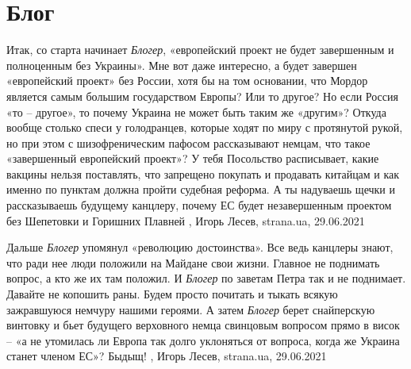  
 
 
 
 
\chapter{Блог}
\label{sec:slova.blog}

Итак, со старта начинает \emph{Блогер}, «европейский проект не будет завершенным и
полноценным без Украины». Мне вот даже интересно, а будет завершен «европейский
проект» без России, хотя бы на том основании, что Мордор является самым большим
государством Европы? Или то другое? Но если Россия «то – другое», то почему
Украина не может быть таким же «другим»? Откуда вообще столько спеси у
голодранцев, которые ходят по миру с протянутой рукой, но при этом с
шизофреническим пафосом рассказывают немцам, что такое «завершенный европейский
проект»? У тебя Посольство расписывает, какие вакцины нельзя поставлять, что
запрещено покупать и продавать китайцам и как именно по пунктам должна пройти
судебная реформа. А ты надуваешь щечки и рассказываешь будущему канцлеру,
почему ЕС будет незавершенным проектом без Шепетовки и Горишних Плавней
, 
Игорь Лесев, strana.ua, 29.06.2021

Дальше \emph{Блогер} упомянул «революцию достоинства». Все ведь канцлеры знают, что
ради нее люди положили на Майдане свои жизни. Главное не поднимать вопрос, а
кто же их там положил. И \emph{Блогер} по заветам Петра так и не поднимает. Давайте не
копошить раны. Будем просто почитать и тыкать всякую зажравшуюся немчуру нашими
героями.  А затем \emph{Блогер} берет снайперскую винтовку и бьет будущего верховного
немца свинцовым вопросом прямо в висок – «а не утомилась ли Европа так долго
уклоняться от вопроса, когда же Украина станет членом ЕС»? Быдыщ! 
, 
Игорь Лесев, strana.ua, 29.06.2021
